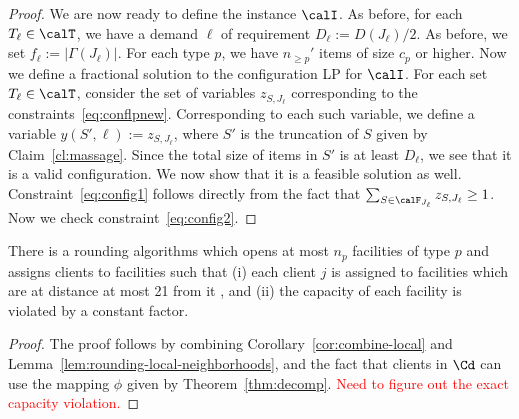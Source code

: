 \begin{proof}
We are now ready to define the instance $\calI$. As before, for each $T_\ell \in \calT$, we have a demand $\ell$ of requirement $D_\ell := D(J_\ell)/2$. 
As before, we set $f_\ell := |\Gamma(J_\ell)|$. For each type $p$, we have $n_{\geq p}'$ items of size $c_p$ or higher. Now 
we define a fractional solution to the configuration LP for $\calI$. For each set $T_\ell \in \calT$, consider the set of variables $z_{S, J_\ell}$
corresponding to the constraints~\ref{eq:conflpnew}. Corresponding to each such variable, we define a variable $y(S', \ell) := z_{S, J_\ell}$,
where $S'$ is the truncation of $S$ given by Claim~\ref{cl:massage}. 
Since the total size of items in $S'$ is at least $D_\ell$, we see that 
it is a valid configuration. We now show that it is a feasible solution as well. Constraint~\ref{eq:config1} follows directly from the fact that 
$\sum_{S \in \calF_{J_\ell}} z_{S, J_\ell} \geq 1$. Now we check constraint~\ref{eq:config2}. 

%
%
\end{proof}

\begin{theorem}
\label{thm:final}
There is a rounding algorithms which opens at most $n_p$ facilities of type $p$ and assigns clients to facilities such  that 
(i) each client $j$ is assigned to facilities which are at distance at most 21 from it , and (ii) the capacity of each facility is violated by a constant factor. 
\end{theorem}
\begin{proof}
The proof follows by combining Corollary~\ref{cor:combine-local} and Lemma~\ref{lem:rounding-local-neighborhoods}, and the fact that 
clients in $\Cd$ can use the mapping $\phi$ given by Theorem~\ref{thm:decomp}. 
\textcolor{red}{Need to figure out the exact capacity violation.}
\end{proof}




